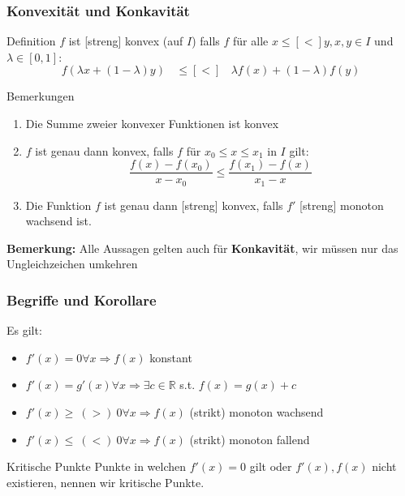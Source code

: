 \documentclass[a4paper,8pt]{extarticle}
\newenvironment{bemerkung}{
   \noindent \textbf{Bemerkung:  }}{}
\def\R{\mathbb{R}}
\begin{document}
\subsubsection{Konvexität und Konkavität}
\begin{mainbox}{Definition}
  $f$ ist [streng] konvex (auf $I$) falls $f$ für alle $x \leq [<] y, x, y \in I$ und $\lambda \in [0, 1]$:
  $$f(\lambda x + (1 - \lambda) y) \ \ \ \ \leq [<] \ \ \ \ \lambda f(x) + (1 - \lambda)f(y)$$
\end{mainbox}
\begin{mainbox}{Bemerkungen}
  \begin{enumerate}
    \item Die Summe zweier konvexer Funktionen ist konvex
    \item $f$ ist genau dann konvex, falls $f$ für $x_0 \leq x \leq x_1$ in $I$ gilt:
          $$\frac{f(x) - f(x_0)}{x - x_0} \leq \frac{f(x_1) - f(x)}{x_1 - x}$$
    \item Die Funktion $f$ ist genau dann [streng] konvex, falls $f'$
          [streng] monoton wachsend ist.  
  \end{enumerate}
\end{mainbox}

\begin{bemerkung}
  Alle Aussagen gelten auch für \textbf{Konkavität}, wir müssen nur das Ungleichzeichen umkehren
\end{bemerkung}

\subsubsection{Begriffe und Korollare}
Es gilt:
\begin{itemize}
  \item $f'(x) = 0 \forall x \Rightarrow f(x)$ konstant
  \item $f'(x) = g'(x) \forall x \Rightarrow \exists c \in \R$ s.t. $f(x) = g(x) + c$
  \item $f'(x) \geq \ (>) \ 0 \forall x \Rightarrow f(x)$ (strikt) monoton wachsend
  \item $f'(x) \leq \ (<) \ 0 \forall x \Rightarrow f(x)$ (strikt) monoton fallend
\end{itemize}

\begin{subbox}{Kritische Punkte}
  Punkte in welchen $f'(x) = 0$ gilt oder $f'(x), f(x)$ nicht existieren, nennen wir kritische Punkte.
\end{subbox}
\end{document}
